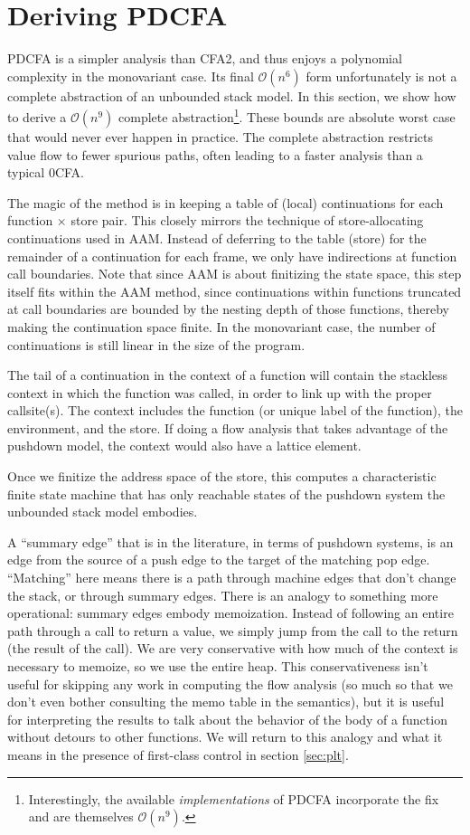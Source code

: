 \documentclass{llncs}
\begin{document}
\section{Deriving PDCFA}
\label{sec:pdcfa}
PDCFA is a simpler analysis than CFA2, and thus enjoys a polynomial
complexity in the monovariant case. Its final ${\mathcal O}(n^6)$ form
unfortunately is not a complete abstraction of an unbounded stack
model. In this section, we show how to derive a ${\mathcal O}(n^9)$
complete abstraction\footnote{Interestingly, the available
  \emph{implementations} of PDCFA incorporate the fix and are
  themselves ${\mathcal O}(n^9)$.}. These bounds are absolute worst
case that would never ever happen in practice. The complete
abstraction restricts value flow to fewer spurious paths, often
leading to a faster analysis than a typical 0CFA.

The magic of the method is in keeping a table of (local) continuations
for each function $\times$ store pair. This closely mirrors the
technique of store-allocating continuations used in AAM. Instead of
deferring to the table (store) for the remainder of a continuation for
each frame, we only have indirections at function call
boundaries. Note that since AAM is about finitizing the state space,
this step itself fits within the AAM method, since continuations
within functions truncated at call boundaries are bounded by the
nesting depth of those functions, thereby making the continuation
space finite. In the monovariant case, the number of continuations is
still linear in the size of the program.

The tail of a continuation in the context of a function will contain
the stackless context in which the function was called, in order to
link up with the proper callsite(s). The context includes the function
(or unique label of the function), the environment, and the store. If
doing a flow analysis that takes advantage of the pushdown model, the
context would also have a lattice element.

Once we finitize the address space of the store, this computes a
characteristic finite state machine that has only reachable states of
the pushdown system the unbounded stack model embodies.

A ``summary edge'' that is in the literature, in terms of pushdown
systems, is an edge from the source of a push edge to the target of
the matching pop edge. ``Matching'' here means there is a path through
machine edges that don't change the stack, or through summary
edges. There is an analogy to something more operational: summary
edges embody memoization. Instead of following an entire path through
a call to return a value, we simply jump from the call to the return
(the result of the call). We are very conservative with how much of
the context is necessary to memoize, so we use the entire heap. This
conservativeness isn't useful for skipping any work in computing the
flow analysis (so much so that we don't even bother consulting the
memo table in the semantics), but it is useful for interpreting the
results to talk about the behavior of the body of a function without
detours to other functions. We will return to this analogy and what it
means in the presence of first-class control in section \ref{sec:plt}.
\end{document}

